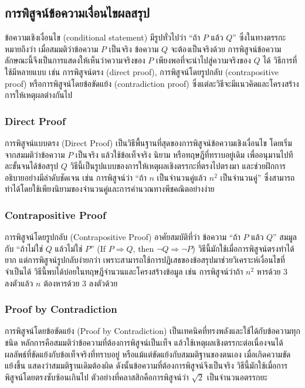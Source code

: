 \subsection{การพิสูจน์ข้อความเงื่อนไขผลสรุป}
ข้อความเชิงเงื่อนไข (conditional statement) มีรูปทั่วไปว่า “ถ้า $P$ แล้ว $Q$” ซึ่งในทางตรรกะหมายถึงว่า เมื่อสมมติว่าข้อความ $P$ เป็นจริง ข้อความ $Q$ จะต้องเป็นจริงด้วย การพิสูจน์ข้อความลักษณะนี้จึงเป็นการแสดงให้เห็นว่าความจริงของ $P$ เพียงพอที่จะนำไปสู่ความจริงของ $Q$ ได้ วิธีการที่ใช้มีหลายแบบ เช่น การพิสูจน์ตรง (direct proof), การพิสูจน์โดยรูปกลับ (contrapositive proof) หรือการพิสูจน์โดยข้อขัดแย้ง (contradiction proof) ซึ่งแต่ละวิธีจะมีแนวคิดและโครงสร้างการให้เหตุผลต่างกันไป

\subsubsection{Direct Proof}
การพิสูจน์แบบตรง (Direct Proof) เป็นวิธีพื้นฐานที่สุดของการพิสูจน์ข้อความเชิงเงื่อนไข โดยเริ่มจากสมมติว่าข้อความ $P$ เป็นจริง แล้วใช้ข้อเท็จจริง นิยาม หรือทฤษฎีที่ทราบอยู่เดิม เพื่ออนุมานไปทีละขั้นจนได้ข้อสรุป $Q$ วิธีนี้เป็นรูปแบบของการให้เหตุผลเชิงตรรกะที่ตรงไปตรงมา และช่วยฝึกการอธิบายอย่างมีลำดับชัดเจน เช่น การพิสูจน์ว่า “ถ้า $n$ เป็นจำนวนคู่แล้ว $n^2$ เป็นจำนวนคู่” ซึ่งสามารถทำได้โดยใช้เพียงนิยามของจำนวนคู่และการคำนวณทางพีชคณิตอย่างง่าย

\subsubsection{Contrapositive Proof}
การพิสูจน์โดยรูปกลับ (Contrapositive Proof) อาศัยสมบัติที่ว่า ข้อความ “ถ้า $P$ แล้ว $Q$” สมมูลกับ “ถ้าไม่ใช่ $Q$ แล้วไม่ใช่ $P$” (If $P \Rightarrow Q$, then $\neg Q \Rightarrow \neg P$) วิธีนี้มักใช้เมื่อการพิสูจน์ตรงทำได้ยาก แต่การพิสูจน์รูปกลับง่ายกว่า เพราะสามารถใช้การปฏิเสธของข้อสรุปมาช่วยวิเคราะห์เงื่อนไขที่จำเป็นได้ วิธีนี้พบได้บ่อยในทฤษฎีจำนวนและโครงสร้างข้อมูล เช่น การพิสูจน์ว่าถ้า $n^2$ หารด้วย 3 ลงตัวแล้ว $n$ ต้องหารด้วย 3 ลงตัวด้วย

\subsubsection{Proof by Contradiction}
การพิสูจน์โดยข้อขัดแย้ง (Proof by Contradiction) เป็นเทคนิคที่ทรงพลังและใช้ได้กับข้อความทุกชนิด หลักการคือสมมติว่าข้อความที่ต้องการพิสูจน์เป็นเท็จ แล้วใช้เหตุผลเชิงตรรกะต่อเนื่องจนได้ผลลัพธ์ที่ขัดแย้งกับข้อเท็จจริงที่ทราบอยู่ หรือแม้แต่ขัดแย้งกับสมมติฐานของตนเอง เมื่อเกิดความขัดแย้งขึ้น แสดงว่าสมมติฐานเดิมต้องผิด ดังนั้นข้อความที่ต้องการพิสูจน์จึงเป็นจริง วิธีนี้มักใช้เมื่อการพิสูจน์โดยตรงซับซ้อนเกินไป ตัวอย่างที่คลาสสิกคือการพิสูจน์ว่า $\sqrt{2}$ เป็นจำนวนอตรรกยะ

